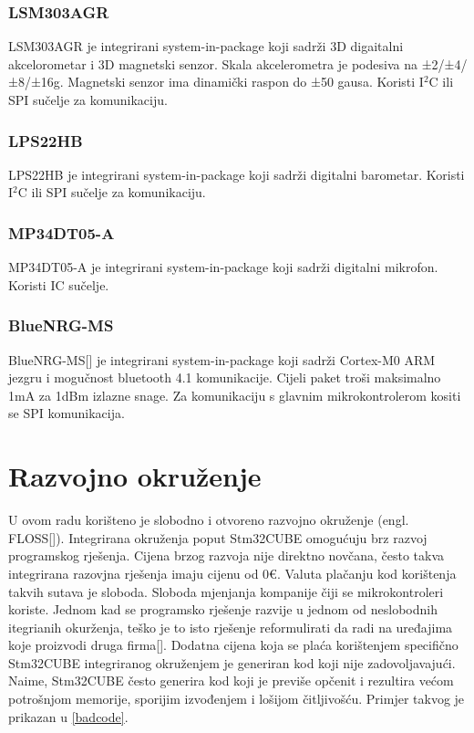 \documentclass[times, utf8, diplomski]{diplomski}
\begin{document}
\subsubsection{LSM303AGR}
LSM303AGR je integrirani system-in-package koji sadrži 3D digaitalni akcelorometar i 3D magnetski senzor. Skala akcelerometra je podesiva na
±2/±4/±8/±16g. Magnetski senzor ima dinamički raspon do ±50 gausa. Koristi I\(^2\)C ili SPI sučelje za komunikaciju.

\subsubsection{LPS22HB}
LPS22HB je integrirani system-in-package koji sadrži digitalni barometar. Koristi I\(^2\)C ili SPI sučelje za komunikaciju.

\subsubsection{MP34DT05-A}
MP34DT05-A je integrirani system-in-package koji sadrži digitalni mikrofon. Koristi IC sučelje.

\subsubsection{BlueNRG-MS}
BlueNRG-MS[\cite{BlueNrgMs}] je integrirani system-in-package koji sadrži Cortex-M0 ARM jezgru i mogučnost bluetooth 4.1 komunikacije.
Cijeli paket troši maksimalno 1mA za 1dBm izlazne snage. Za komunikaciju s glavnim mikrokontrolerom kositi se SPI komunikacija.

\section{Razvojno okruženje}
U ovom radu korišteno je slobodno i otvoreno razvojno okruženje (engl. FLOSS[\cite{FLOSS}]). Integrirana okruženja poput Stm32CUBE omogućuju brz razvoj programskog rješenja. Cijena brzog razvoja nije direktno novčana, često takva integrirana razovjna rješenja imaju cijenu od 0€. Valuta plačanju kod korištenja takvih sutava je sloboda. Sloboda mjenjanja kompanije čiji se mikrokontroleri koriste. Jednom kad se programsko rješenje razvije u jednom od neslobodnih itegrianih okurženja, teško je to isto rješenje reformulirati da radi na uređajima koje proizvodi druga firma[\cite{VENDORLOCKIN}]. Dodatna cijena koja se plaća korištenjem specifično Stm32CUBE integriranog okruženjem je generiran kod koji nije zadovoljavajući. Naime, Stm32CUBE često generira kod koji je previše opčenit i rezultira većom potrošnjom memorije, sporijim izvođenjem i lošijom čitljivošću. Primjer takvog je prikazan u \ref{badcode}.
\end{document}

